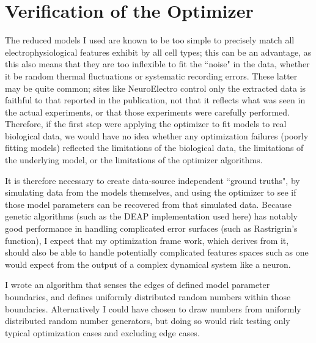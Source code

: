 \section{Verification of the Optimizer}
\label{sec:optimizer-verification}
The reduced models I used are known to be too simple to precisely match all electrophysiological features exhibit by all cell types; this can be an advantage, as this also means that they are too inflexible to fit the ``noise" in the data, whether it be random thermal fluctuations or systematic recording errors.
These latter may be quite common; sites like NeuroElectro control only the extracted data is faithful to that reported in the publication, not that it reflects what was seen in the actual experiments, or that those experiments were carefully performed.
Therefore, if the first step were applying the optimizer to fit models to real biological data, we would have no idea whether any optimization failures (poorly fitting models) reflected the limitations of the biological data, the limitations of the underlying model, or the limitations of the optimizer algorithms.

It is therefore necessary to create data-source independent ``ground truths", by simulating data from the models themselves, and using the optimizer to see if those model parameters can be recovered from that simulated data.
Because genetic algorithms (such as the DEAP \citep{DEAP_JMLR2012} implementation used here) has notably good performance in handling complicated error surfaces (such as Rastrigrin's function), I expect that my optimization frame work, which derives from it, should also be able to handle potentially complicated features spaces such as one would expect from the output of a complex dynamical system like a neuron.

I wrote an algorithm that senses the edges of defined model parameter boundaries, and defines uniformly distributed random numbers within those boundaries. Alternatively I could have chosen to draw numbers from uniformly distributed random number generators, but doing so would risk testing only typical optimization cases and excluding edge cases.


